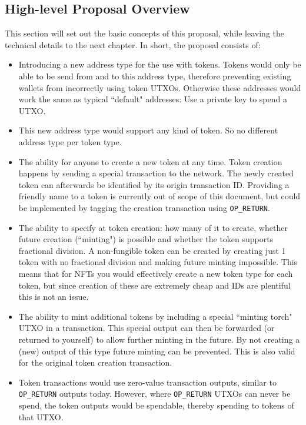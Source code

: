 \documentclass{article}
\begin{document}
\subsection{High-level Proposal Overview}

This section will set out the basic concepts of this proposal, while leaving the technical details to the next chapter.
In short, the proposal consists of:

\begin{itemize}
    \item Introducing a new address type for the use with tokens. Tokens would only be able to be send from and to this address type, therefore preventing existing wallets from incorrectly using token UTXOs. Otherwise these addresses would work the same as typical ``default" addresses: Use a private key to spend a UTXO.
    \item This new address type would support any kind of token. So no different address type per token type.
    \item The ability for anyone to create a new token at any time. Token creation happens by sending a special transaction to the network. The newly created token can afterwards be identified by its origin transaction ID. Providing a friendly name to a token is currently out of scope of this document, but could be implemented by tagging the creation transaction using \texttt{OP\_RETURN}.
    \item The ability to specify at token creation: how many of it to create, whether future creation (``minting") is possible and whether the token supports fractional division. A non-fungible token can be created by creating just 1 token with no fractional division and making future minting impossible. This means that for NFTs you would effectively create a new token type for each token, but since creation of these are extremely cheap and IDs are plentiful this is not an issue.
    \item The ability to mint additional tokens by including a special ``minting torch" UTXO in a transaction. This special output can then be forwarded (or returned to yourself) to allow further minting in the future. By not creating a (new) output of this type future minting can be prevented. This is also valid for the original token creation transaction.
    \item Token transactions would use zero-value transaction outputs, similar to \texttt{OP\_RETURN} outputs today. However, where \texttt{OP\_RETURN} UTXOs can never be spend, the token outputs would be spendable, thereby spending to tokens of that UTXO.

\end{itemize}
\end{document}
